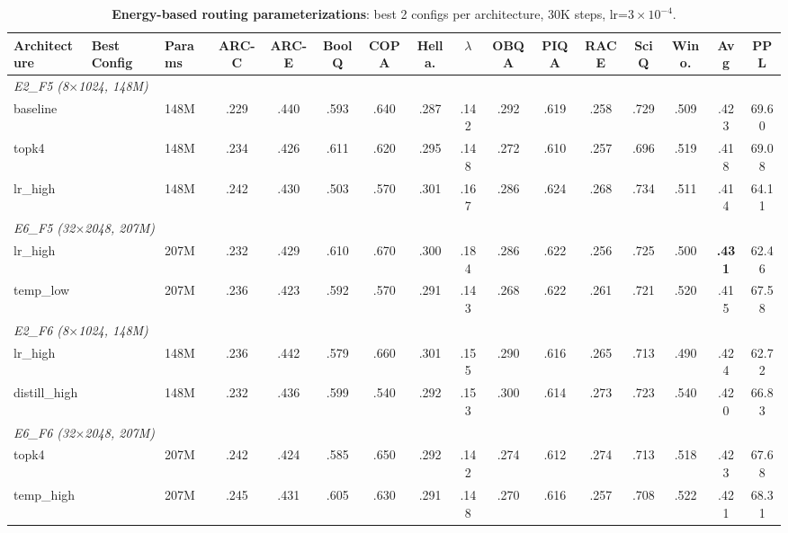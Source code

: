 \documentclass[oneside]{article}
\begin{document}
\begin{table}[t]
\centering
\caption{\textbf{Energy-based routing parameterizations}: best 2 configs per architecture, 30K steps, lr=$3\times10^{-4}$.}
\label{tab:energy_routing}
\begin{adjustbox}{max width=\textwidth}
\begin{tabular}{l|l|l|ccccccccccc|c|c}
\toprule
\textbf{Architecture} & \textbf{Best Config} & \textbf{Params} & \textbf{ARC-C} & \textbf{ARC-E} & \textbf{BoolQ} & \textbf{COPA} & \textbf{Hella.} & \textbf{$\lambda$} & \textbf{OBQA} & \textbf{PIQA} & \textbf{RACE} & \textbf{SciQ} & \textbf{Wino.} & \textbf{Avg} & \textbf{PPL} \\
\midrule
\multicolumn{15}{l}{\textit{E2\_F5 (8$\times$1024, 148M)}} \\
baseline        & & 148M & .229 & .440 & .593 & .640 & .287 & .142 & .292 & .619 & .258 & .729 & .509 & .423 & 69.60 \\
topk4           & & 148M & .234 & .426 & .611 & .620 & .295 & .148 & .272 & .610 & .257 & .696 & .519 & .418 & 69.08 \\
lr\_high        & & 148M & .242 & .430 & .503 & .570 & .301 & .167 & .286 & .624 & .268 & .734 & .511 & .414 & 64.11 \\
\midrule
\multicolumn{15}{l}{\textit{E6\_F5 (32$\times$2048, 207M)}} \\
lr\_high        & & 207M & .232 & .429 & .610 & .670 & .300 & .184 & .286 & .622 & .256 & .725 & .500 & \textbf{.431} & 62.46 \\
temp\_low       & & 207M & .236 & .423 & .592 & .570 & .291 & .143 & .268 & .622 & .261 & .721 & .520 & .415 & 67.58 \\
\midrule
\multicolumn{15}{l}{\textit{E2\_F6 (8$\times$1024, 148M)}} \\
lr\_high        & & 148M & .236 & .442 & .579 & .660 & .301 & .155 & .290 & .616 & .265 & .713 & .490 & .424 & 62.72 \\
distill\_high   & & 148M & .232 & .436 & .599 & .540 & .292 & .153 & .300 & .614 & .273 & .723 & .540 & .420 & 66.83 \\
\midrule
\multicolumn{15}{l}{\textit{E6\_F6 (32$\times$2048, 207M)}} \\
topk4           & & 207M & .242 & .424 & .585 & .650 & .292 & .142 & .274 & .612 & .274 & .713 & .518 & .423 & 67.68 \\
temp\_high      & & 207M & .245 & .431 & .605 & .630 & .291 & .148 & .270 & .616 & .257 & .708 & .522 & .421 & 68.31 \\

\end{tabular}
\end{adjustbox}
\end{table}
\end{document}
